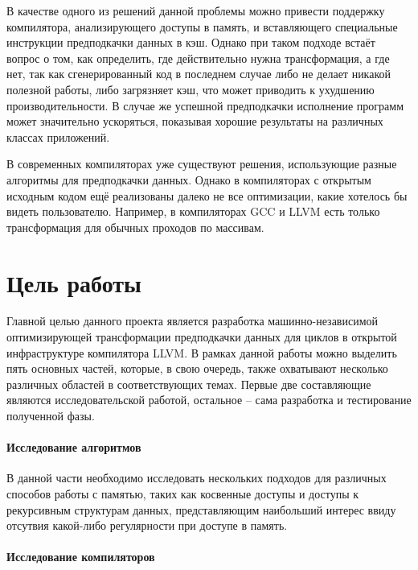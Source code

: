 \documentclass[12pt,a4paper]{article}
\begin{document}
В качестве одного из решений данной проблемы можно привести поддержку компилятора, анализирующего доступы в память, и вставляющего специальные инструкции предподкачки данных в кэш. Однако при таком подходе встаёт вопрос о том, как определить, где действительно нужна трансформация, а где нет, так как сгенерированный код в последнем случае либо не делает никакой полезной работы, либо загрязняет кэш, что может приводить к ухудшению производительности. В случае же успешной предподкачки исполнение программ может значительно ускоряться, показывая хорошие результаты на различных классах приложений\cite{MemAcc}.

В современных компиляторах уже существуют решения, использующие разные алгоритмы для предподкачки данных. Однако в компиляторах с открытым исходным кодом ещё реализованы далеко не все оптимизации, какие хотелось бы видеть пользователю. Например, в компиляторах GCC\cite{GCCPref} и LLVM есть только трансформация для обычных проходов по массивам.

\newpage

\section{Цель работы}

\indent

Главной целью данного проекта является разработка машинно-независимой оптимизирующей трансформации предподкачки данных для циклов в открытой инфраструктуре компилятора LLVM. В рамках данной работы можно выделить пять основных частей, которые, в свою очередь, также охватывают несколько различных областей в соответствующих темах. Первые две составляющие являются исследовательской работой, остальное -- сама разработка и тестирование полученной фазы.

\paragraph{Исследование алгоритмов}

В данной части необходимо исследовать нескольких подходов для различных способов работы с памятью, таких как косвенные доступы и доступы к рекурсивным структурам данных, представляющим наибольший интерес ввиду отсутвия какой-либо регулярности при доступе в память.

\paragraph{Исследование компиляторов}
\end{document}
